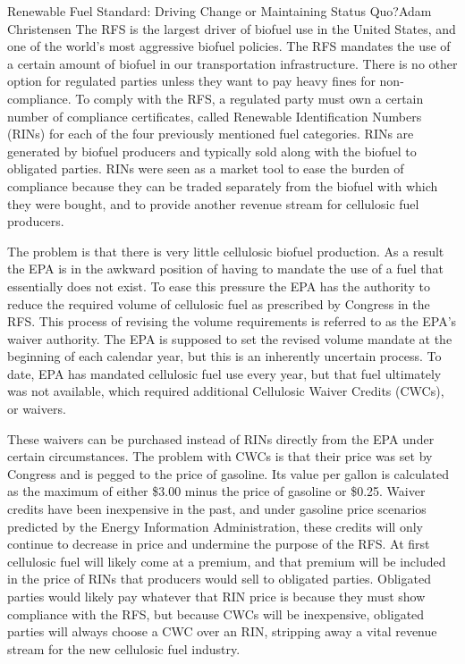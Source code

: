 \documentclass{papertex}
\begin{document}
\begin{news}{2}{Renewable Fuel Standard: Driving Change or Maintaining Status 
    Quo?}{Adam Christensen}{}{}
The RFS is the largest driver of biofuel use in the United States, and one of 
the world’s most aggressive biofuel policies. The RFS mandates the use of a 
certain amount of biofuel in our transportation infrastructure. There is no 
other option for regulated parties unless they want to pay heavy fines for 
non-compliance. To comply with the RFS, a regulated party must own a certain 
number of compliance certificates, called Renewable Identification Numbers 
(RINs) for each of the four previously mentioned fuel categories. RINs are 
generated by biofuel producers and typically sold along with the biofuel to 
obligated parties. RINs were seen as a market tool to ease the burden of 
compliance because they can be traded separately from the biofuel with which 
they were bought, and to provide another revenue stream for cellulosic fuel 
producers.

The problem is that there is very little cellulosic biofuel production. As a 
result the EPA is in the awkward position of having to mandate the use of a 
fuel that essentially does not exist. To ease this pressure the EPA has the 
authority to reduce the required volume of cellulosic fuel as prescribed by 
Congress in the RFS. This process of revising the volume requirements is 
referred to as the EPA’s waiver authority. The EPA is supposed to set the 
revised volume mandate at the beginning of each calendar year, but this is an 
inherently uncertain process. To date, EPA has mandated cellulosic fuel use 
every year, but that fuel ultimately was not available, which required 
additional Cellulosic Waiver Credits (CWCs), or waivers.

These waivers can be purchased instead of RINs directly from the EPA under 
certain circumstances. The problem with CWCs is that their price was set by 
Congress and is pegged to the price of gasoline. Its value per gallon is 
calculated as the maximum of either \$3.00 minus the price of gasoline or 
\$0.25. Waiver credits have been inexpensive in the past, and under gasoline 
price scenarios predicted by the Energy Information Administration, these 
credits will only continue to decrease in price and undermine the purpose of 
the RFS. At first cellulosic fuel will likely come at a premium, and that 
premium will be included in the price of RINs that producers would sell to 
obligated parties. Obligated parties would likely pay whatever that RIN price 
is because they must show compliance with the RFS, but because CWCs will be 
inexpensive, obligated parties will always choose a CWC over an RIN, stripping 
away a vital revenue stream for the new cellulosic fuel industry.


\end{news}
\end{document}
